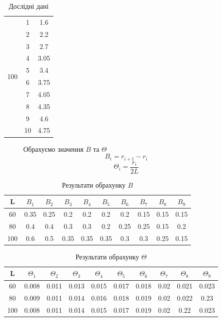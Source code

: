 \begin{table}[h]
\begin{tabular}{|c|c|c|}
        \multirow{10}{*}{100} & 1 & 1.6 \\
        \cline{2-3}
        & 2 & 2.2 \\
        \cline{2-3}
        & 3 & 2.7 \\        
        \cline{2-3}
        & 4 & 3.05 \\
        \cline{2-3}
        & 5 & 3.4 \\        
        \cline{2-3}
        & 6 & 3.75 \\
        \cline{2-3}
        & 7 & 4.05 \\
        \cline{2-3}        
        & 8 & 4.35 \\
        \cline{2-3}
        & 9 & 4.6 \\
        \cline{2-3}        
        & 10 & 4.75 \\
        \hline

    \end{tabular}
    \caption{Дослідні дані}
\end{table}

\begin{figure}[h!]
    Обрахуємо значення $B$ та $\Theta$
    $$ B_i = r_{i+1} - r_i $$
    $$ \Theta_i = \frac{ r_i }{2L} $$
\end{figure}

\begin{table}[h]
    \centering
    \begin{tabular}{|c|c|c|c|c|c|c|c|c|c|}
        \hline
        \textbf{L} & $B_1$ & $B_2$ & $B_3$ & $B_4$ & $B_5$ & $B_6$ & $B_7$ & $B_8$ & $B_9$ \\
        \hline
        60 & 0.35 & 0.25 & 0.2 & 0.2 & 0.2 & 0.2 & 0.15 & 0.15 & 0.15 \\
        \hline
        80 & 0.4 & 0.4 & 0.3 & 0.3 & 0.2 & 0.25 & 0.25 & 0.15 & 0.2 \\
        \hline
        100 & 0.6 & 0.5 & 0.35 & 0.35 & 0.35 & 0.3 & 0.3 & 0.25 & 0.15 \\
        \hline
    \end{tabular}
    
    \caption{Результати обрахунку $B$}
\end{table}

\begin{table}[h!]
    \centering
    \begin{tabular}{|c|c|c|c|c|c|c|c|c|c|}
        \hline
        \textbf{L} & $\Theta_1$ & $\Theta_2$ & $\Theta_3$ & $\Theta_4$ & $\Theta_5$ & $\Theta_6$ & $\Theta_7$ & $\Theta_8$ & $\Theta_9$ \\
        \hline
        60 & 0.008 & 0.011 & 0.013 & 0.015 & 0.017 & 0.018 & 0.02 & 0.021 & 0.023 \\
        \hline
        80 & 0.009 & 0.011 & 0.014 & 0.016 & 0.018 & 0.019 & 0.02 & 0.022 & 0.23 \\
        \hline
        100 & 0.008 & 0.011 & 0.014 & 0.015 & 0.017 & 0.019 & 0.02 & 0.22 & 0.023 \\
        \hline
    \end{tabular}
    
    \caption{Результати обрахунку $\Theta$}
\end{table}

